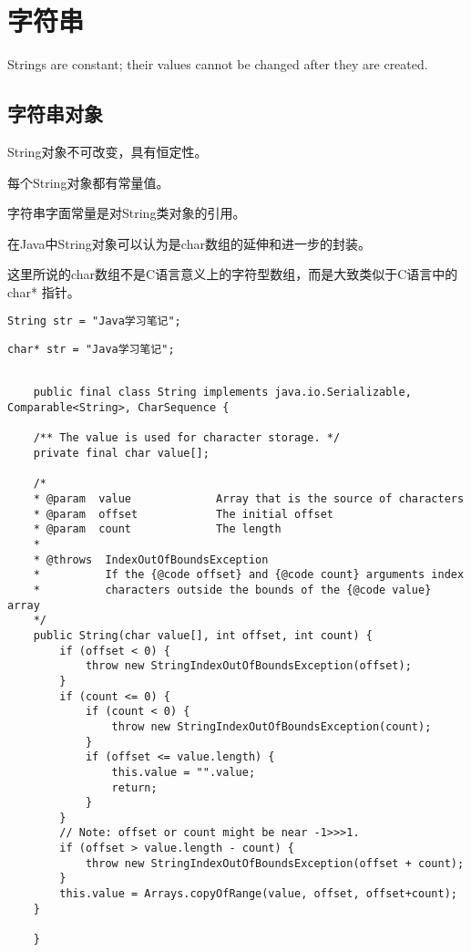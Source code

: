\chapter{字符串}
\label{chap:string}

    Strings are constant; their values cannot be changed after they are created.

\section{字符串对象}

String对象不可改变，具有恒定性。

每个String对象都有常量值。

字符串字面常量是对String类对象的引用。

在Java中String对象可以认为是char数组的延伸和进一步的封装。

\begin{noteblock}
    这里所说的char数组不是C语言意义上的字符型数组，而是大致类似于C语言中的 char* 指针。 \par
    \begin{lstlisting}[style=cjava]
    String str = "Java学习笔记"; 
    \end{lstlisting}
    \begin{lstlisting}[style=cjava]
    char* str = "Java学习笔记";
    \end{lstlisting}
\end{noteblock}

\begin{lstlisting}[style=cjava]

    public final class String implements java.io.Serializable, Comparable<String>, CharSequence {

    /** The value is used for character storage. */
    private final char value[];

    /*
    * @param  value             Array that is the source of characters
    * @param  offset            The initial offset
    * @param  count             The length
    *
    * @throws  IndexOutOfBoundsException
    *          If the {@code offset} and {@code count} arguments index
    *          characters outside the bounds of the {@code value} array
    */
    public String(char value[], int offset, int count) {
        if (offset < 0) {
            throw new StringIndexOutOfBoundsException(offset);
        }
        if (count <= 0) {
            if (count < 0) {
                throw new StringIndexOutOfBoundsException(count);
            }
            if (offset <= value.length) {
                this.value = "".value;
                return;
            }
        }
        // Note: offset or count might be near -1>>>1.
        if (offset > value.length - count) {
            throw new StringIndexOutOfBoundsException(offset + count);
        }
        this.value = Arrays.copyOfRange(value, offset, offset+count);
    }

    }

\end{lstlisting}

